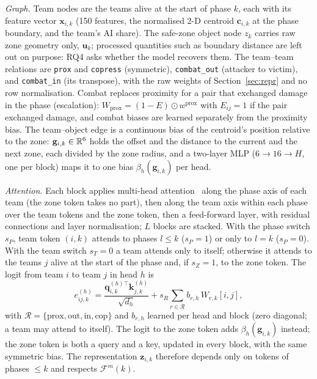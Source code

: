 \emph{Graph.} Team nodes are the teams alive at the start of phase $k$, each with its feature vector $\mathbf{x}_{i,k}$ (150 features, the normalised 2-D centroid $\mathbf{c}_{i,k}$ at the phase boundary, and the team's AI share). The safe-zone object node $z_k$ carries raw zone geometry only, $\mathbf{u}_k$; processed quantities such as boundary distance are left out on purpose: RQ4 asks whether the model recovers them. The team--team relations are \texttt{prox} and \texttt{copress} (symmetric), \texttt{combat\_out} (attacker to victim), and \texttt{combat\_in} (its transpose), with the raw weights of Section~\ref{sec:repr} and no row normalisation. Combat replaces proximity for a pair that exchanged damage in the phase (escalation): $W_{\mathrm{prox}}=(1-E)\odot w^{\mathrm{prox}}$ with $E_{ij}=1$ if the pair exchanged damage, and combat biases are learned separately from the proximity bias. The team--object edge is a continuous bias of the centroid's position relative to the zone: $\mathbf{g}_{i,k}\in\mathbb{R}^6$ holds the offset and the distance to the current and the next zone, each divided by the zone radius, and a two-layer MLP ($6\to16\to H$, one per block) maps it to one bias $\beta_h(\mathbf{g}_{i,k})$ per head.

\emph{Attention.} Each block applies multi-head attention~\cite{vaswani2017attention} along the phase axis of each team (the zone token takes no part), then along the team axis within each phase over the team tokens and the zone token, then a feed-forward layer, with residual connections and layer normalisation; $L$ blocks are stacked. With the phase switch $s_P$, team token $(i,k)$ attends to phases $l\le k$ ($s_P=1$) or only to $l=k$ ($s_P=0$). With the team switch $s_T=0$ a team attends only to itself; otherwise it attends to the teams $j$ alive at the start of the phase and, if $s_Z=1$, to the zone token. The logit from team $i$ to team $j$ in head $h$ is
\begin{equation}
e^{(h)}_{ij,k}=\frac{\mathbf{q}^{(h)\top}_{i,k}\mathbf{k}^{(h)}_{j,k}}{\sqrt{d_h}}+s_R\sum_{r\in\mathcal{R}}b_{r,h}\,W_{r,k}[i,j],
\label{eq:team-logit}
\end{equation}
with $\mathcal{R}=\{\mathrm{prox},\mathrm{out},\mathrm{in},\mathrm{cop}\}$ and $b_{r,h}$ learned per head and block (zero diagonal; a team may attend to itself). The logit to the zone token adds $\beta_h(\mathbf{g}_{i,k})$ instead; the zone token is both a query and a key, updated in every block, with the same symmetric bias. The representation $\mathbf{z}_{i,k}$ therefore depends only on tokens of phases $\le k$ and respects $\mathcal{F}^m(k)$.

